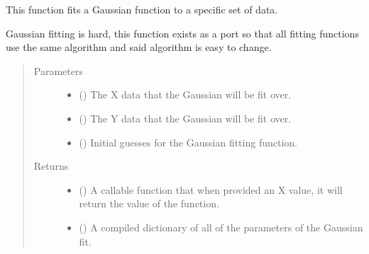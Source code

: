 \documentclass[letterpaper,10pt,english]{sphinxmanual}
\begin{document}
\begin{fulllineitems}
\label{\detokenize{python_docstrings/IfA_Smeargle.meta.modeling_and_fitting:IfA_Smeargle.meta.modeling_and_fitting.smeargle_fit_gaussian_function}}
This function fits a Gaussian function to a specific set of data.

Gaussian fitting is hard, this function exists as a port so that
all fitting functions use the same algorithm and said algorithm is easy
to change.
\begin{quote}\begin{description}
\item[{Parameters}] \leavevmode\begin{itemize}
\item {} 
 () \textendash{} The X data that the Gaussian will be fit over.

\item {} 
 () \textendash{} The Y data that the Gaussian will be fit over.

\item {} 
 () \textendash{} Initial guesses for the Gaussian fitting function.

\end{itemize}

\item[{Returns}] \leavevmode
\begin{itemize}
\item {} 
 () \textendash{} A callable function that when provided an X value, it will return
the value of the function.

\item {} 
 () \textendash{} A compiled dictionary of all of the parameters of the Gaussian fit.

\end{itemize}


\end{description}\end{quote}

\end{fulllineitems}
\end{document}
